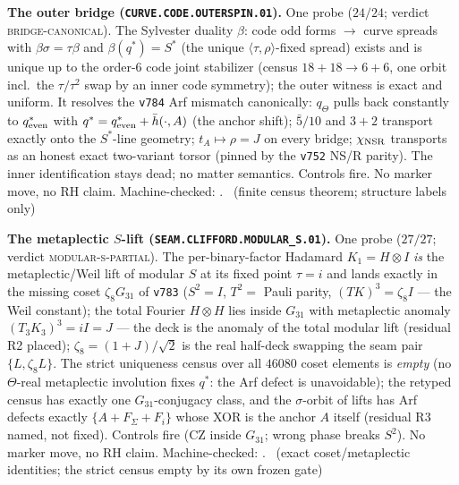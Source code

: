 \par\smallskip\noindent\textbf{The outer bridge
(\texttt{CURVE.CODE.OUTERSPIN.01}).}
One probe ($24/24$; verdict \textsc{bridge-canonical}).  The
Sylvester duality $\beta$: code odd forms $\to$ curve spreads with
$\beta\sigma=\tau\beta$ and $\beta(q^{*})=S^{*}$ (the unique
$\langle\tau,\rho\rangle$-fixed spread) exists and is unique up to
the order-6 code joint stabilizer (census $18+18\to6+6$, one orbit
incl.\ the $\tau/\tau^2$ swap by an inner code symmetry); the outer
witness is exact and uniform.  It resolves the \texttt{v784} Arf
mismatch canonically: $q_{\Theta}$ pulls back constantly to
$q^{*}_{\rm even}$ with $q^{*}=q^{*}_{\rm even}+\bar h(\cdot,A)$
(the anchor shift); $\bar 5/10$ and $3{+}2$ transport exactly onto
the $S^{*}$-line geometry; $t_A\mapsto\rho=J$ on every bridge;
$\chi_{\rm NSR}$ transports as an honest exact two-variant torsor
(pinned by the \texttt{v752} NS/R parity).  The inner identification
stays dead; no matter semantics.  Controls fire.  No marker move,
no RH claim.
Machine-checked: .
\mE\ (finite census theorem; structure labels only)
\par\smallskip

\par\smallskip\noindent\textbf{The metaplectic $S$-lift
(\texttt{SEAM.CLIFFORD.MODULAR\_S.01}).}
One probe ($27/27$; verdict \textsc{modular-s-partial}).  The
per-binary-factor Hadamard $K_1=H\otimes I$ \emph{is} the
metaplectic/Weil lift of modular $S$ at its fixed point $\tau=i$ and
lands exactly in the missing coset $\zeta_8G_{31}$ of \texttt{v783}
($S^2=I$, $T^2=$ Pauli parity, $(TK)^3=\zeta_8 I$ --- the Weil
constant); the total Fourier $H\otimes H$ lies inside $G_{31}$ with
metaplectic anomaly $(T_3K_3)^3=iI=J$ --- the deck is the anomaly of
the total modular lift (residual R2 placed); $\zeta_8=(1{+}J)/\sqrt2$
is the real half-deck swapping the seam pair $\{L,\zeta_8L\}$.  The
strict uniqueness census over all $46080$ coset elements is
\emph{empty} (no $\Theta$-real metaplectic involution fixes
$q^{*}$: the Arf defect is unavoidable); the retyped census has
exactly one $G_{31}$-conjugacy class, and the $\sigma$-orbit of
lifts has Arf defects exactly $\{A+F_{\Sigma}+F_i\}$ whose XOR is
the anchor $A$ itself (residual R3 named, not fixed).  Controls fire
(CZ inside $G_{31}$; wrong phase breaks $S^2$).  No marker move, no
RH claim.
Machine-checked: .
\mE\ (exact coset/metaplectic identities; the strict census empty by
its own frozen gate)
\par\smallskip

